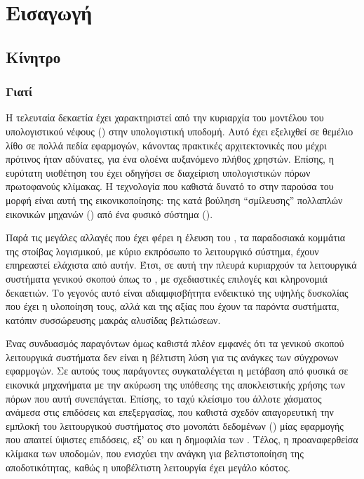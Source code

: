 \chapter{Εισαγωγή}

\section{Κίνητρο}

\subsection{Γιατί }
Η τελευταία δεκαετία έχει χαρακτηριστεί από την κυριαρχία του μοντέλου του
υπολογιστικού νέφους () στην υπολογιστική υποδομή. Αυτό έχει
εξελιχθεί σε θεμέλιο λίθο σε πολλά πεδία εφαρμογών, κάνοντας πρακτικές
αρχιτεκτονικές που μέχρι πρότινος ήταν αδύνατες, για ένα ολοένα αυξανόμενο
πλήθος χρηστών. Επίσης, η ευρύτατη υιοθέτηση του έχει οδηγήσει σε διαχείριση
υπολογιστικών πόρων πρωτοφανούς κλίμακας. Η τεχνολογία που καθιστά δυνατό το
 στην παρούσα του μορφή είναι αυτή της εικονικοποίησης: της κατά
βούληση ``σμίλευσης'' πολλαπλών εικονικών μηχανών () από ένα φυσικό
σύστημα (\host{}).

Παρά τις μεγάλες αλλαγές που έχει φέρει η έλευση του , τα παραδοσιακά
κομμάτια της στοίβας λογισμικού, με κύριο εκπρόσωπο το λειτουργικό σύστημα,
έχουν επηρεαστεί ελάχιστα από αυτήν. Έτσι, σε αυτή την πλευρά κυριαρχούν τα
λειτουργικά συστήματα γενικού σκοπού όπως το \linux{}, με σχεδιαστικές επιλογές
και κληρονομιά δεκαετιών. Το γεγονός αυτό είναι αδιαμφισβήτητα ενδεικτικό της
υψηλής δυσκολίας που έχει η υλοποίηση τους, αλλά και της αξίας που έχουν τα
παρόντα συστήματα, κατόπιν συσσώρευσης μακράς αλυσίδας βελτιώσεων.

Ένας συνδυασμός παραγόντων όμως καθιστά πλέον εμφανές ότι τα γενικού σκοπού
λειτουργικά συστήματα δεν είναι η βέλτιστη λύση για τις ανάγκες των σύγχρονων
εφαρμογών. Σε αυτούς τους παράγοντες συγκαταλέγεται η μετάβαση από φυσικά σε
εικονικά μηχανήματα με την ακύρωση της υπόθεσης της αποκλειστικής χρήσης των
πόρων που αυτή συνεπάγεται. Επίσης, το ταχύ κλείσιμο του άλλοτε χάσματος ανάμεσα
στις επιδόσεις  και επεξεργασίας, που καθιστά σχεδόν απαγορευτική την
εμπλοκή του λειτουργικού συστήματος στο μονοπάτι δεδομένων () μίας
εφαρμογής που απαιτεί ύψιστες επιδόσεις, εξ' ου και η δημοφιλία των \cite{dpdk,
spdk}. Τέλος, η προαναφερθείσα κλίμακα των υποδομών, που ενισχύει την ανάγκη για
βελτιστοποίηση της αποδοτικότητας, καθώς η υποβέλτιστη λειτουργία έχει μεγάλο
κόστος.

